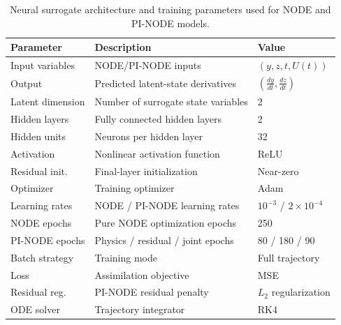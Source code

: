 \begin{table}[H]
\caption{Neural surrogate architecture and training parameters used for NODE and PI-NODE models.}
\label{tab:nn_parameters}
\centering
\footnotesize
\setlength{\tabcolsep}{4pt}
\renewcommand{\arraystretch}{1.03}

\begin{tabular}{p{2.5cm} p{5.6cm} p{2.4cm}}
\hline
\textbf{Parameter} & \textbf{Description} & \textbf{Value} \\
\hline

Input variables & NODE/PI-NODE inputs & $(y,z,t,U(t))$ \\

Output & Predicted latent-state derivatives &
$\left(\frac{dy}{dt},\frac{dz}{dt}\right)$ \\

Latent dimension & Number of surrogate state variables & 2 \\

Hidden layers & Fully connected hidden layers & 2 \\

Hidden units & Neurons per hidden layer & 32 \\

Activation & Nonlinear activation function & ReLU \\

Residual init. & Final-layer initialization & Near-zero \\

Optimizer & Training optimizer & Adam \\

Learning rates & NODE / PI-NODE learning rates &
$10^{-3}$ / $2\times10^{-4}$ \\

NODE epochs & Pure NODE optimization epochs & 250 \\

PI-NODE epochs & Physics / residual / joint epochs &
80 / 180 / 90 \\

Batch strategy & Training mode & Full trajectory \\

Loss & Assimilation objective & MSE \\

Residual reg. & PI-NODE residual penalty &
$L_2$ regularization \\

ODE solver & Trajectory integrator & RK4 \\


\end{tabular}
\end{table}
